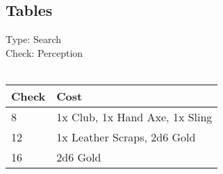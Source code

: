 \subsection{Tables}
Type: Search\\
Check: Perception\\
\\
\begin{minipage}{0.8\textwidth}
	\begin{tabular}{|l | l|}
		\hline
		Check & Cost\\
		\hline
		8 & 1x Club, 1x Hand Axe, 1x Sling\\
		12 & 1x Leather Scraps, 2d6 Gold\\
		16 & 2d6 Gold\\
		\hline
	\end{tabular}
\end{minipage}
\pagebreak